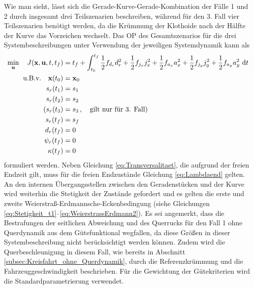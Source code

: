 Wie man sieht, lässt sich die Gerade-Kurve-Gerade-Kombination der Fälle 1 und 2 durch insgesamt drei Teilszenarien beschreiben, während für den 3. Fall vier Teilszenarien benötigt werden, da die Krümmung der Klothoide nach der Hälfte der Kurve das Vorzeichen wechselt. Das \gls{OP} des Gesamtszenarios für die drei Systembeschreibungen unter Verwendung der jeweiligen Systemdynamik kann als
\begin{align}
\min_{\boldsymbol{\mathrm{u}}} \quad J(\boldsymbol{\mathrm{x}},\boldsymbol{\mathrm{u}},t,t_f) &= t_f + \int_{t_0}^{t_f}\frac{1}{2}f_{d_r} d_r^2 + \frac{1}{2}f_{j_x} j_x^2 + \frac{1}{2}f_{a_x} a_x^2 + \frac{1}{2}f_{j_y} j_y^2 + \frac{1}{2}f_{a_y} a_y^2~\textrm{d}{t} \\
\textrm{u.B.v.} \quad \boldsymbol{\mathrm{x}}(t_0) &= \boldsymbol{\mathrm{x}}_0 \\
s_r(t_1) &= s_1 \\
s_r(t_2) &= s_2 \\
(s_r(t_3) &= s_3\,, \quad \textrm{gilt nur für 3. Fall}) \\
s_r(t_f) &= s_f \\
d_r(t_f) &= 0 \\
\psi_r(t_f) &= 0 \\
\kappa(t_f) &= 0
\end{align}
formuliert werden. Neben Gleichung \eqref{eq:Transversalitaet}, die aufgrund der freien Endzeit gilt, muss für die freien Endzustände Gleichung \eqref{eq:Lambdaend} gelten. An den internen Übergangsstellen zwischen den Geradenstücken und der Kurve wird weiterhin die Stetigkeit der Zustände gefordert und es gelten die erste und zweite Weierstraß-Erdmannsche-Eckenbedingung (siehe Gleichungen \eqref{eq:Stetigkeit_t1}--\eqref{eq:WeierstrassErdmann2}). Es sei angemerkt, dass die Bestrafungen der seitlichen Abweichung und des Querrucks für den Fall 1 ohne Querdynamik aus dem Gütefunktional wegfallen, da diese Größen in dieser Systembeschreibung nicht berücksichtigt werden können. Zudem wird die Querbeschleunigung in diesem Fall, wie bereits in Abschnitt \ref{subsec:Kreisfahrt_ohne_Querdynamik}, durch die Referenzkrümmung und die Fahrzeuggeschwindigkeit beschrieben. Für die Gewichtung der Gütekriterien wird die Standardparametrierung verwendet.
